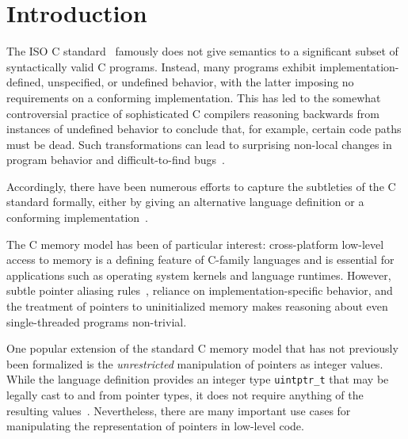 \section{Introduction}
%

The ISO C standard~\cite{iso2011iec} famously does not give semantics to a significant
subset of syntactically valid C programs. Instead, many programs
exhibit implementation-defined, unspecified, or undefined behavior,
with the latter imposing no requirements on a conforming
implementation. This has led to the somewhat controversial practice of
sophisticated C compilers reasoning backwards from instances of
undefined behavior to conclude that, for example, certain code paths
must be dead. Such transformations can lead to surprising non-local
changes in program behavior and difficult-to-find bugs~\cite{wang2013towards,yang2011finding}.

Accordingly, there have been numerous efforts to capture the
subtleties of the C standard formally, either by giving an alternative
language definition or a conforming implementation~\cite{norrish1998c,leroy:compcert,ellison2012executable}.

 The C memory model has been of
particular interest: cross-platform low-level access to memory is a
defining feature of C-family languages and is essential for
applications such as operating system kernels and language
runtimes. However, subtle pointer aliasing
rules~\cite{krebbers2013aliasing}, reliance on implementation-specific
behavior, and the treatment of pointers to uninitialized memory makes
reasoning about even single-threaded programs non-trivial.

One popular extension of the standard C memory model that has not
previously been formalized is the \emph{unrestricted} manipulation of
pointers as integer values. While the language definition provides an integer
type \texttt{uintptr\_t} that may be legally cast to and from pointer
types, it does not require anything of the resulting values~\cite[\S7.20.1.4p1]{iso2011iec}. 
Nevertheless, there are many important use cases for manipulating
the representation of pointers in low-level code.

